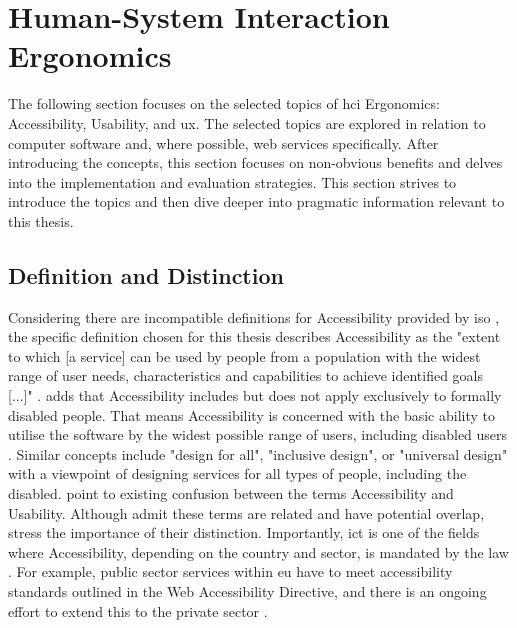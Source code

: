 \section{Human-System Interaction Ergonomics}

The following section focuses on the selected topics of \gls{hci} Ergonomics: Accessibility, Usability, and \gls{ux}.
The selected topics are explored in relation to computer software and, where possible, web services specifically.
After introducing the concepts, this section focuses on non-obvious benefits and delves into the implementation and evaluation strategies.
This section strives to introduce the topics and then dive deeper into pragmatic information relevant to this thesis.

\subsection{Definition and Distinction}
\label{Literature-HSIE-Definition}

Considering there are incompatible definitions for Accessibility provided by \gls{iso} \parencite{Wegge_Zimmermann_2007}, the specific definition chosen for this thesis describes Accessibility as the "extent to which [a service] can be used by people from a population with the widest range of user needs, characteristics and capabilities to achieve identified goals [...]" \parencite{ISO_9241-11:2018}.
\textcite{ISO_10779:2020} adds that Accessibility includes but does not apply exclusively to formally disabled people.
That means Accessibility is concerned with the basic ability to utilise the software by the widest possible range of users, including disabled users \parencite{Wegge_Zimmermann_2007}.
Similar concepts include "design for all", "inclusive design", or "universal design" \parencite[p. 1210]{Juergen_et_all_2020} with a viewpoint of designing services for all types of people, including the disabled.
\textcite{Wegge_Zimmermann_2007} point to existing confusion between the terms Accessibility and Usability.
Although \textcite{Wegge_Zimmermann_2007} admit these terms are related and have potential overlap, \textcite{Wegge_Zimmermann_2007} stress the importance of their distinction.
Importantly, \gls{ict} is one of the fields where Accessibility, depending on the country and sector, is mandated by the law \parencite{Wegge_Zimmermann_2007, Juergen_et_all_2020}.
For example, public sector services within \gls{eu} have to meet accessibility standards outlined in the Web Accessibility Directive, and there is an ongoing effort to extend this to the private sector \parencite{EU_Web_Accessibility}.

